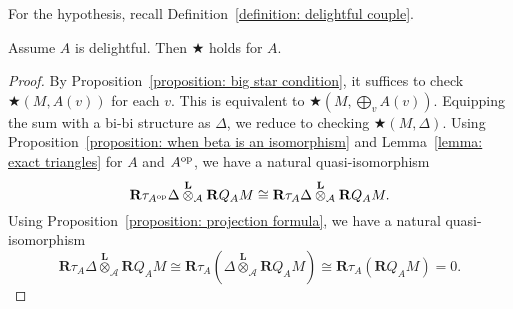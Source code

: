 For the hypothesis, recall Definition~\ref{definition: delightful couple}. 

\begin{proposition} \label{proposition: vanishing of tensor}
  Assume \(A\) is delightful. Then \(\bigstar\) holds for \(A\).
\end{proposition}

\begin{proof}
  By Proposition~\ref{proposition: big star condition}, it suffices to check \(\bigstar(M,A(v))\) for each \(v\). This is equivalent to \(\bigstar(M,\bigoplus_v A(v))\). Equipping the sum with a bi-bi structure as \(\Delta\), we reduce to checking \(\bigstar(M,\Delta)\). Using Proposition~\ref{proposition: when beta is an isomorphism} and Lemma~\ref{lemma: exact triangles} for \(A\) and \(A^{\operatorname{op}}\), we have a natural quasi-isomorphism
  \[\mathbf{R}\tau_{A^{\operatorname{op}}} \Delta \overset{\mathbf{L}}{\otimes}_{\mathcal A} \mathbf{R}Q_A M \cong \mathbf{R}\tau_{A} \Delta \overset{\mathbf{L}}{\otimes}_{\mathcal A} \mathbf{R}Q_{A} M.\]
  Using Proposition~\ref{proposition: projection formula}, we have a natural quasi-isomorphism
  \[\mathbf{R}\tau_{A} \Delta \overset{\mathbf{L}}{\otimes}_{\mathcal A} \mathbf{R}Q_{A} M \cong \mathbf{R}\tau_{A} \left( \Delta \overset{\mathbf{L}}{\otimes}_{\mathcal A} \mathbf{R}Q_{A} M  \right) \cong \mathbf{R}\tau_{A} \left( \mathbf{R}Q_{A} M \right) = 0.\]
  
\end{proof}

